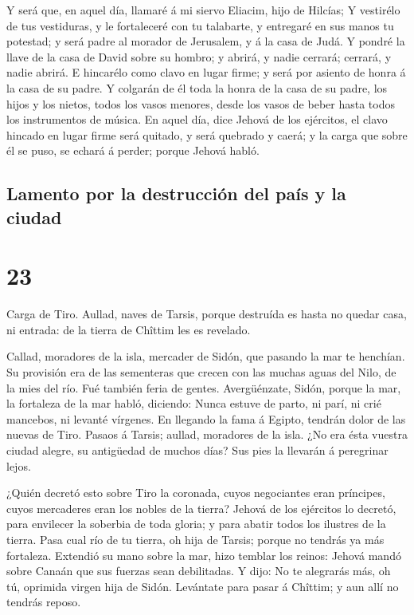  Y será que, en aquel día, llamaré á mi siervo Eliacim,
hijo de Hilcías;  Y vestirélo de tus vestiduras, y le
fortaleceré con tu talabarte, y entregaré en sus manos tu potestad; y
será padre al morador de Jerusalem, y á la casa de Judá. 
Y pondré la llave de la casa de David sobre su hombro; y abrirá, y nadie
cerrará; cerrará, y nadie abrirá.  E hincarélo como clavo
en lugar firme; y será por asiento de honra á la casa de su padre.
 Y colgarán de él toda la honra de la casa de su padre,
los hijos y los nietos, todos los vasos menores, desde los vasos de
beber hasta todos los instrumentos de música.  En aquel
día, dice Jehová de los ejércitos, el clavo hincado en lugar firme será
quitado, y será quebrado y caerá; y la carga que sobre él se puso, se
echará á perder; porque Jehová habló.

\hypertarget{lamento-por-la-destrucciuxf3n-del-pauxeds-y-la-ciudad}{%
\subsection{Lamento por la destrucción del país y la
ciudad}\label{lamento-por-la-destrucciuxf3n-del-pauxeds-y-la-ciudad}}

\hypertarget{section-23-23}{%
\section{23}\label{section-23-23}}

 Carga de Tiro. Aullad, naves de Tarsis, porque destruída
es hasta no quedar casa, ni entrada: de la tierra de Chîttim les es
revelado.

 Callad, moradores de la isla, mercader de Sidón, que
pasando la mar te henchían.  Su provisión era de las
sementeras que crecen con las muchas aguas del Nilo, de la mies del río.
Fué también feria de gentes.  Avergüénzate, Sidón, porque
la mar, la fortaleza de la mar habló, diciendo: Nunca estuve de parto,
ni parí, ni crié mancebos, ni levanté vírgenes.  En
llegando la fama á Egipto, tendrán dolor de las nuevas de Tiro.
 Pasaos á Tarsis; aullad, moradores de la isla.
 ¿No era ésta vuestra ciudad alegre, su antigüedad de
muchos días? Sus pies la llevarán á peregrinar lejos.

 ¿Quién decretó esto sobre Tiro la coronada, cuyos
negociantes eran príncipes, cuyos mercaderes eran los nobles de la
tierra?  Jehová de los ejércitos lo decretó, para
envilecer la soberbia de toda gloria; y para abatir todos los ilustres
de la tierra.  Pasa cual río de tu tierra, oh hija de
Tarsis; porque no tendrás ya más fortaleza.  Extendió su
mano sobre la mar, hizo temblar los reinos: Jehová mandó sobre Canaán
que sus fuerzas sean debilitadas.  Y dijo: No te
alegrarás más, oh tú, oprimida virgen hija de Sidón. Levántate para
pasar á Chîttim; y aun allí no tendrás reposo.

